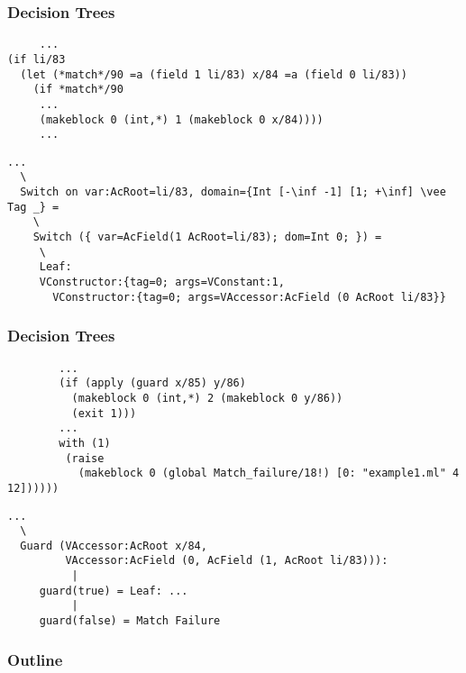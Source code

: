 \documentclass{beamer}
\begin{document}
\begin{frame}[fragile]
  \frametitle{Decision Trees}
  \begin{small}
    \hspace{-1em}
    \begin{minipage}{0.36\linewidth}
      \begin{lstlisting}
     ...
(if li/83
  (let (*match*/90 =a (field 1 li/83) x/84 =a (field 0 li/83))
    (if *match*/90
     ...
     (makeblock 0 (int,*) 1 (makeblock 0 x/84))))
     ...
      \end{lstlisting}
      \hrulefill
      \begin{lstlisting}
...
  \
  Switch on var:AcRoot=li/83, domain={Int [-\inf -1] [1; +\inf] \vee Tag _} =
    \
    Switch ({ var=AcField(1 AcRoot=li/83); dom=Int 0; }) =
     \
     Leaf:
     VConstructor:{tag=0; args=VConstant:1,
       VConstructor:{tag=0; args=VAccessor:AcField (0 AcRoot li/83}}

      \end{lstlisting}
    \end{minipage}
  \end{small}
\end{frame}

\begin{frame}[fragile]
  \frametitle{Decision Trees}
  \begin{small}
    \hspace{-1em}
    \begin{minipage}{0.36\linewidth}
      \begin{lstlisting}
        ...
        (if (apply (guard x/85) y/86)
          (makeblock 0 (int,*) 2 (makeblock 0 y/86))
          (exit 1)))
        ...
        with (1)
         (raise
           (makeblock 0 (global Match_failure/18!) [0: "example1.ml" 4 12])))))
      \end{lstlisting}
      \hrulefill
      \begin{lstlisting}
...
  \
  Guard (VAccessor:AcRoot x/84,
         VAccessor:AcField (0, AcField (1, AcRoot li/83))):
          |
     guard(true) = Leaf: ...
          |
     guard(false) = Match Failure
      \end{lstlisting}
    \end{minipage}
  \end{small}
\end{frame}

\begin{frame}
  \frametitle{Outline}
  \tableofcontents
\end{frame}
\end{document}
